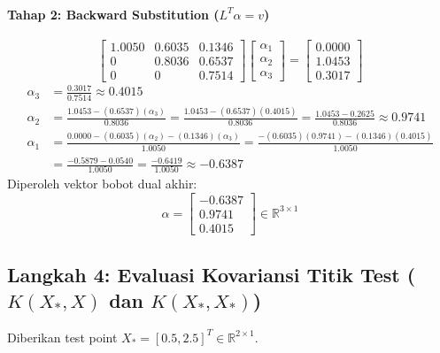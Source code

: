 \documentclass[11pt,a4paper]{article}
\def\boldsymbol#1{#1}%
\def\mathbf#1{#1}%
\begin{document}
\paragraph{Tahap 2: Backward Substitution ($L^T \boldsymbol{\alpha} = \mathbf{v}$)}
\begin{equation}
\begin{bmatrix}
1.0050 & 0.6035 & 0.1346 \\
0 & 0.8036 & 0.6537 \\
0 & 0 & 0.7514
\end{bmatrix}
\begin{bmatrix} \alpha_1 \\ \alpha_2 \\ \alpha_3 \end{bmatrix}
=
\begin{bmatrix} 0.0000 \\ 1.0453 \\ 0.3017 \end{bmatrix}
\end{equation}
\begin{align*}
\alpha_3 &= \frac{0.3017}{0.7514} \approx \mathbf{0.4015} \\
\alpha_2 &= \frac{1.0453 - (0.6537)(\alpha_3)}{0.8036} = \frac{1.0453 - (0.6537)(0.4015)}{0.8036} = \frac{1.0453 - 0.2625}{0.8036} \approx \mathbf{0.9741} \\
\alpha_1 &= \frac{0.0000 - (0.6035)(\alpha_2) - (0.1346)(\alpha_3)}{1.0050} = \frac{-(0.6035)(0.9741) - (0.1346)(0.4015)}{1.0050} \\
&= \frac{-0.5879 - 0.0540}{1.0050} = \frac{-0.6419}{1.0050} \approx \mathbf{-0.6387}
\end{align*}
Diperoleh vektor bobot dual akhir:
\begin{equation}
\boldsymbol{\alpha} = \begin{bmatrix} -0.6387 \\ 0.9741 \\ 0.4015 \end{bmatrix} \in \mathbb{R}^{3 \times 1}
\end{equation}

\subsection{Langkah 4: Evaluasi Kovariansi Titik Test \texorpdfstring{($K(X_*, X)$ dan $K(X_*, X_*)$)}{(K(X*, X) dan K(X*, X*))}}
Diberikan test point $X_* = [0.5, 2.5]^T \in \mathbb{R}^{2 \times 1}$.
\end{document}
